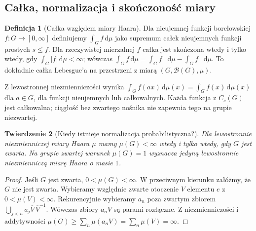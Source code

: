\documentclass[11pt,a4paper]{article}
\numberwithin{equation}{section}
\theoremstyle{plain}
\newtheorem{twierdzenie}{Twierdzenie}[section]
\theoremstyle{definition}
\newtheorem{definicja}[twierdzenie]{Definicja}
\theoremstyle{remark}
\begin{document}
\subsection*{Całka, normalizacja i skończoność miary}
\begin{definicja}[Całka względem miary Haara]
Dla nieujemnej funkcji borelowskiej $f:G\to[0,\infty]$ definiujemy $\int_G f\,\mathrm d\mu$ jako supremum całek nieujemnych funkcji prostych $s\le f$. Dla rzeczywistej mierzalnej $f$ całka jest skończona wtedy i tylko wtedy, gdy $\int_G|f|\,\mathrm d\mu<\infty$; wówczas $\int_Gf\,\mathrm d\mu=\int_Gf^+\,\mathrm d\mu-\int_Gf^-\,\mathrm d\mu$. To dokładnie całka Lebesgue'a na przestrzeni z miarą $(G,\mathcal B(G),\mu)$.
\end{definicja}
Z lewostronnej niezmienniczości wynika $\int_G f(ax)\,\mathrm d\mu(x)=\int_Gf(x)\,\mathrm d\mu(x)$ dla $a\in G$, dla funkcji nieujemnych lub całkowalnych. Każda funkcja z $C_c(G)$ jest całkowalna; ciągłość bez zwartego nośnika nie zapewnia tego na grupie niezwartej.
\begin{twierdzenie}[Kiedy istnieje normalizacja probabilistyczna?]
Dla lewostronnie niezmienniczej miary Haara $\mu$ mamy $\mu(G)<\infty$ wtedy i tylko wtedy, gdy $G$ jest zwarta. Na grupie zwartej warunek $\mu(G)=1$ wyznacza jedyną lewostronnie niezmienniczą miarę Haara o masie $1$.
\end{twierdzenie}
\begin{proof}
Jeśli $G$ jest zwarta, $0<\mu(G)<\infty$. W przeciwnym kierunku załóżmy, że $G$ nie jest zwarta. Wybieramy względnie zwarte otoczenie $V$ elementu $e$ z $0<\mu(V)<\infty$. Rekurencyjnie wybieramy $a_n$ poza zwartym zbiorem $\bigcup_{j<n}a_j\overline V\,\overline V^{-1}$. Wówczas zbiory $a_nV$ są parami rozłączne. Z niezmienniczości i addytywności $\mu(G)\ge\sum_n\mu(a_nV)=\sum_n\mu(V)=\infty$.
\end{proof}
\end{document}
